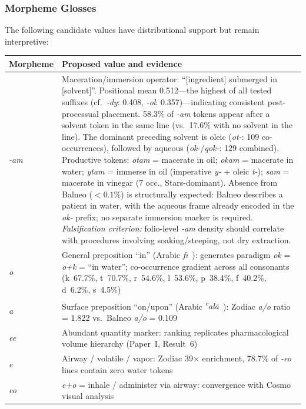 \documentclass[11pt,a4paper]{article}
\begin{document}
\subsubsection{Morpheme Glosses}

The following candidate values have distributional support but remain interpretive:

\begin{longtable}{lp{9.5cm}}
\toprule
Morpheme & Proposed value and evidence \\
\midrule
\endhead
\textit{-am} & Maceration/immersion operator: ``[ingredient] submerged in [solvent]''. Positional mean 0.512---the highest of all tested suffixes (cf.\ \textit{-dy}: 0.408, \textit{-ol}: 0.357)---indicating consistent post-processual placement. 58.3\% of \textit{-am} tokens appear after a solvent token in the same line (vs.\ 17.6\% with no solvent in the line). The dominant preceding solvent is oleic (\textit{ot-}: 109 co-occurrences), followed by aqueous (\textit{ok-}/\textit{qok-}: 129 combined). Productive tokens: \textit{otam} = macerate in oil; \textit{okam} = macerate in water; \textit{ytam} = immerse in oil (imperative \textit{y-} + oleic \textit{t-}); \textit{sam} = macerate in vinegar (7 occ., Stars-dominant). Absence from Balneo ($<0.1\%$) is structurally expected: Balneo describes a patient in water, with the aqueous frame already encoded in the \textit{ok-} prefix; no separate immersion marker is required. \textit{Falsification criterion:} folio-level \textit{-am} density should correlate with procedures involving soaking/steeping, not dry extraction. \\
\textit{o} & General preposition ``in'' (Arabic \textit{f\={\i}}\ ): generates paradigm \textit{ok} = \textit{o+k} = ``in water''; co-occurrence gradient across all consonants (k~67.7\%, t~70.7\%, r~54.6\%, l~53.6\%, p~38.4\%, f~40.2\%, d~6.2\%, s~4.5\%) \\
\textit{a} & Surface preposition ``on/upon'' (Arabic \textit{\textsuperscript{c}al\=a}\ ): Zodiac \textit{a/o} ratio = 1.822 vs.\ Balneo \textit{a/o} = 0.109 \\
\textit{ee} & Abundant quantity marker: ranking replicates pharmacological volume hierarchy (Paper~I, Result~6) \\
\textit{e} & Airway / volatile / vapor: Zodiac 39$\times$ enrichment, 78.7\% of \textit{-eo} lines contain zero water tokens \\
\textit{eo} & \textit{e+o} = inhale / administer via airway: convergence with Cosmo visual analysis \\

\end{longtable}
\end{document}
